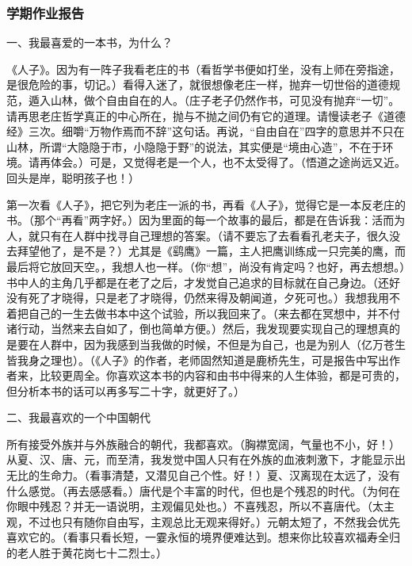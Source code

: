 \subsubsection*{学期作业报告}
\par {}
\par {}
\par 一、我最喜爱的一本书，为什么？
\par 《人子》。因为有一阵子我看老庄的书（看哲学书便如打坐，没有上师在旁指途，是很危险的事，切记。）看得入迷了，就很想像老庄一样，抛弃一切世俗的道德规范，遁入山林，做个自由自在的人。（庄子老子仍然作书，可见没有抛弃“一切”。请再思老庄哲学真正的中心所在，抛与不抛之间仍有它的道理。请慢读老子《道德经》三次。细嚼“万物作焉而不辞”这句话。再说，“自由自在”四字的意思并不只在山林，所谓“大隐隐于市，小隐隐于野”的说法，其实便是“境由心造”，不在于环境。请再体会。）可是，又觉得老是一个人，也不太受得了。（悟道之途尚远又近。回头是岸，聪明孩子也！）
\par 第一次看《人子》，把它列为老庄一派的书，再看《人子》，觉得它是一本反老庄的书。（那个“再看”两字好。）因为里面的每一个故事的最后，都是在告诉我：活而为人，就只有在人群中找寻自己理想的答案。（请不要忘了去看看孔老夫子，很久没去拜望他了，是不是？）尤其是《鹞鹰》一篇，主人把鹰训练成一只完美的鹰，而最后将它放回天空。，我想人也一样。（你“想”，尚没有肯定吗？也好，再去想想。）书中人的主角几乎都是在老了之后，才发觉自己追求的目标就在自己身边。（还好没有死了才晓得，只是老了才晓得，仍然来得及朝闻道，夕死可也。）我想我用不着把自己的一生去做书本中这个试验，所以我回来了。（来去都在冥想中，并不付诸行动，当然来去自如了，倒也简单方便。）然后，我发现要实现自己的理想真的是要在人群中，因为我感到当我做的时候，不但是为自己，也是为别人（亿万苍生皆我身之理也）。（《人子》的作者，老师固然知道是鹿桥先生，可是报告中写出作者来，比较更周全。你喜欢这本书的内容和由书中得来的人生体验，都是可贵的，但分析本书的话可以再多写二十字，就更好了。）
\par 二、我最喜欢的一个中国朝代
\par 所有接受外族并与外族融合的朝代，我都喜欢。（胸襟宽阔，气量也不小，好！）从夏、汉、唐、元，而至清，我发觉中国人只有在外族的血液刺激下，才能显示出无比的生命力。（看事清楚，又潜见自己个性。好！）夏、汉离现在太远了，没有什么感觉。（再去感感看。）唐代是个丰富的时代，但也是个残忍的时代。（为何在你眼中残忍？并无一语说明，主观偏见处也。）不喜残忍，所以不喜唐代。（太主观，不过也只有随你自由写，主观总比无观来得好。）元朝太短了，不然我会优先喜欢它的。（看事只看长短，一霎永恒的境界便难达到。想来你比较喜欢福寿全归的老人胜于黄花岗七十二烈士。）
